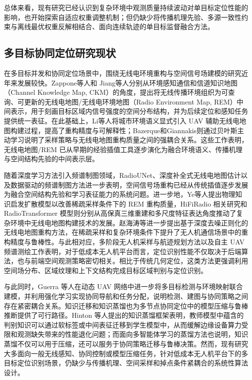 总体来看，现有研究已经认识到复杂环境中观测质量持续波动对单目标定位性能的影响，也开始探索自适应权重调整机制；但仍缺少将传播机理先验、多源一致性约束与离线最优权重反解相结合、面向连续轨迹的单目标监督融合方法。

\subsection{多目标协同定位研究现状}
\label{subsec:1_2_3}

在多目标并发和协同定位场景中，围绕无线电环境重构与空间信号场建模的研究近年来发展较快。Zappone等人和 Jiang等人分别从环境感知通信和信道知识地图（Channel Knowledge Map, CKM）的角度，提出将无线传播环境组织为可查询、可更新的无线电地图/无线电环境地图（Radio Environment Map, REM）中间表示，用于刻画目标区域内信号强度的空间分布结构，并为后续定位和感知任务提供统一表征\cite{Zappone2021CKM,Jiang2022CKMTutorial}。在此基础上，Li等人将城市环境语义显式引入 UAV 辅助无线电地图构建过程，提高了重构精度与可解释性\cite{Li2022UAVRadioMapSemantics}；Bazerque和Giannakis则通过贝叶斯主动学习说明了采样策略与无线电地图重构质量之间的强耦合关系\cite{Bazerque2010BayesianRadioMap}。这些工作表明，无线电地图/REM 已从早期的经验插值工具逐步演化为融合环境语义、传播机理与空间结构先验的中间表示层。

随着深度学习方法引入频谱制图领域，RadioUNet、深度补全式无线电地图估计以及数据驱动的频谱制图方法进一步表明，空间信号场重构已经从传统插值逐步发展为融合空间结构先验和学习表征能力的系统问题\cite{RadioUNet2021,Teganya2022DeepCompletion,Romero2022SpectrumCartography,Feng2025RadioMapSurvey}。进一步地，Ye等人提出物理知识启发扩散模型以改善稀疏采样条件下的 REM 重构质量，HiFiRadio 相关研究和 RadioTransformer 模型则分别从高保真三维重建和多尺度特征表达角度推动了复杂环境中无线电地图构建技术的发展\cite{Ye2025PhysicsREM,HiFiRadio2025,RadioTransformer2025}。赵海涛等进一步提出基于深度去噪正则化的无线电地图重构方法，在稀疏采样和复杂环境条件下提升了无人机通信场景中的重构精度与鲁棒性\cite{Zhao2025DeepDenoisingRadioMap}。与此相对应，多阶段无人机采样与航迹规划方法以及自主 UAV 频谱测绘工作表明，对于低成本无人机平台而言，定位识别性能不仅取决于后端算法，也与前端空间观测策略密切相关\cite{UAVREMPlanning2025,SpectrumSurveying2022,Chen2017UAVRadioMap}。相比于传统几何定位，这类方法更强调利用空间场分布、区域纹理和上下文结构完成目标区域判别与定位识别。

与此同时，Guerra 等人在动态 UAV 网络中进一步将多目标检测与环境映射联合建模，并利用强化学习实现协同导航和任务分配，说明检测、建图与协同策略之间存在紧密耦合关系\cite{Guerra2023JointDetectionMapping}。知识迁移和知识蒸馏也为多节点协同定位中的模型压缩与鲁棒推断提供了可行路径。Hinton 等人提出的知识蒸馏框架\cite{Hinton2015KD}表明，教师模型中蕴含的判别知识可以通过软标签或中间表征迁移到学生模型中，从而缓解边缘设备算力受限和观测缺失带来的性能退化问题；而面向多智能体学习的蒸馏方法也说明，知识蒸馏不仅可以用于压缩，还可以服务于协同策略迁移与鲁棒决策\cite{Tseng2022OfflineMARLKD}。然而，现有研究大多面向一般无线感知、协同控制或模型压缩任务，针对低成本无人机平台下的多目标定位识别场景，仍缺少与传播机理、空间采样和掉点条件紧耦合的系统性算法设计。

